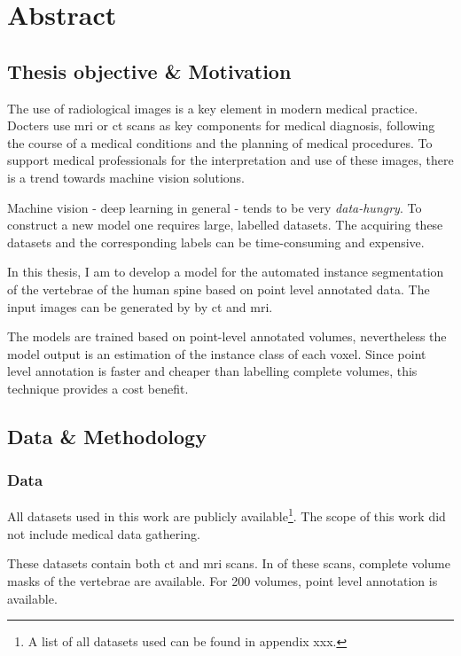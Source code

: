 \chapter*{Abstract}
\begin{multicols}{2}
\section*{Thesis objective \& Motivation}
\par{
The use of radiological images is a key element in modern medical practice. 
Docters use \acrfull{mri} or \acrfull{ct} scans as key components for medical diagnosis, following the course of a medical conditions and the planning of medical procedures.
To support medical professionals for the interpretation and use of these images, there is a trend towards machine vision solutions. 
}
\par{
Machine vision - deep learning in general - tends to be very \textit{data-hungry}. To construct a new model one requires large, labelled datasets.
The acquiring these datasets and the corresponding labels can be time-consuming and expensive. 
}


In this thesis, I am to develop a model for the automated instance segmentation of the vertebrae of the human spine based on point level annotated data.
The input images can be generated by by \acrfull{ct} and \acrfull{mri}.


The models are trained based on point-level annotated volumes, nevertheless the model output is an estimation of the instance class of each voxel.
Since point level annotation is faster and cheaper than labelling complete volumes, this technique provides a cost benefit. 

\section*{Data \& Methodology}

\subsection*{Data}
All datasets used in this work are publicly available\footnote{A list of all datasets used can be found in appendix xxx.}. 
The scope of this work did not include medical data gathering.

These datasets contain both \acrshort{ct} and \acrshort{mri} scans. 
In  of these scans, complete volume masks of the vertebrae are available. 
For 200 volumes, point level annotation is available.


\end{multicols}
